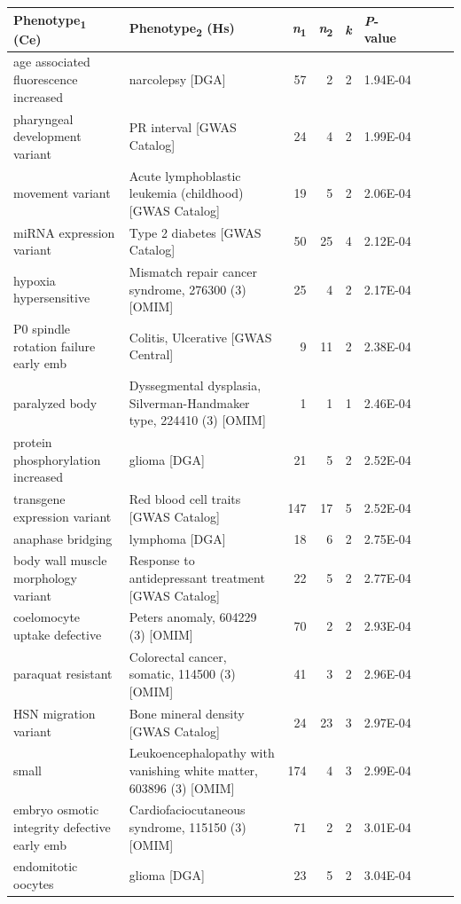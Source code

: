\begin{table}
\tiny
\begin{tabulary}{\linewidth}{LLRRRL}
  Phenotype\textsubscript{1} (Ce) & Phenotype\textsubscript{2} (Hs) & \textsl{n}\textsubscript{1} & \textsl{n}\textsubscript{2} & \textsl{k} & \mbox{\textsl{P}-value~~~~~~~} \\
  \hline
  age associated fluorescence increased & narcolepsy [DGA] & 57 & 2 & 2 & 1.94E-04 \\
  pharyngeal development variant & PR interval [GWAS Catalog] & 24 & 4 & 2 & 1.99E-04 \\
  movement variant & Acute lymphoblastic leukemia (childhood) [GWAS Catalog] & 19 & 5 & 2 & 2.06E-04 \\
  miRNA expression variant & Type 2 diabetes [GWAS Catalog] & 50 & 25 & 4 & 2.12E-04 \\
  hypoxia hypersensitive & Mismatch repair cancer syndrome, 276300 (3) [OMIM] & 25 & 4 & 2 & 2.17E-04 \\
  P0 spindle rotation failure early emb & Colitis, Ulcerative [GWAS Central] & 9 & 11 & 2 & 2.38E-04 \\
  paralyzed body & Dyssegmental dysplasia, Silverman-Handmaker type, 224410 (3) [OMIM] & 1 & 1 & 1 & 2.46E-04 \\
  protein phosphorylation increased & glioma [DGA] & 21 & 5 & 2 & 2.52E-04 \\
  transgene expression variant & Red blood cell traits [GWAS Catalog] & 147 & 17 & 5 & 2.52E-04 \\
  anaphase bridging & lymphoma [DGA] & 18 & 6 & 2 & 2.75E-04 \\
  body wall muscle morphology variant & Response to antidepressant treatment [GWAS Catalog] & 22 & 5 & 2 & 2.77E-04 \\
  coelomocyte uptake defective & Peters anomaly, 604229 (3) [OMIM] & 70 & 2 & 2 & 2.93E-04 \\
  paraquat resistant & Colorectal cancer, somatic, 114500 (3) [OMIM] & 41 & 3 & 2 & 2.96E-04 \\
  HSN migration variant & Bone mineral density [GWAS Catalog] & 24 & 23 & 3 & 2.97E-04 \\
  small & Leukoencephalopathy with vanishing white matter, 603896 (3) [OMIM] & 174 & 4 & 3 & 2.99E-04 \\
  embryo osmotic integrity defective early emb & Cardiofaciocutaneous syndrome, 115150 (3) [OMIM] & 71 & 2 & 2 & 3.01E-04 \\
  endomitotic oocytes & glioma [DGA] & 23 & 5 & 2 & 3.04E-04 \\

\end{tabulary}
\end{table}

